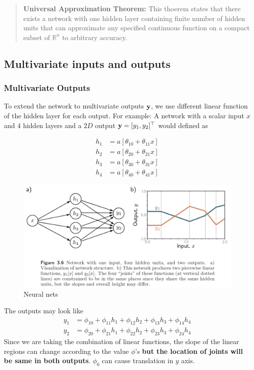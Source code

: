 \documentclass[12pt,reqno]{amsart}
\theoremstyle{plain}
\theoremstyle{definition}
\newcommand{\bb}[1]{\mathbb{#1}}
\begin{document}
\begin{quote}
{\bf Universal Approximation Theorem:} This thoerem states that there exists a network with one hidden layer containing finite number of hidden units that can approximate any specified continuous function on a compact subset of $\bb R^n$ to arbitrary accuracy.
\end{quote}

\subsection{Multivariate inputs and
outputs}\label{multivariate-inputs-and-outputs}

\subsubsection{Multivariate Outputs}\label{multivariate-outputs}

To extend the network to multivariate outputs \({\bf y}\), we use
different linear function of the hidden layer for each output. For
example: A network with a scalar input \(x\) and \(4\) hidden layers and
a \(2D\) output \({\bf y} = [y_1, y_2]^\top\) would defined as 

\begin{align*}
    h_1 &= a[\theta_{10} + \theta_{11}x]\\
    h_2 &= a[\theta_{20} + \theta_{21}x]\\
    h_3 &= a[\theta_{30} + \theta_{31}x]\\
    h_4 &= a[\theta_{40} + \theta_{41}x]  
\end{align*}

\begin{figure}[!ht]
    \centering
    \includegraphics[scale=.34]{../assets/dl/nn2output.png}
    \caption{Neural nets}
\end{figure}
The outputs may look like 
\begin{align*}
    y_1 &= \phi_{10} + \phi_{11}h_1 + \phi_{12}h_2 + \phi_{13}h_3 + \phi_{14}h_4 \\
    y_2 &= \phi_{20} + \phi_{21}h_1 + \phi_{22}h_2 + \phi_{23}h_3 + \phi_{24}h_4 
\end{align*}
Since we are taking the combination of linear functions, the slope of the linear regions can change according to the value \(\phi\)'s {\bf but the location of joints will be same in both outputs}. \(\phi_0\) can cause translation in \(y\) axis.
\end{document}

